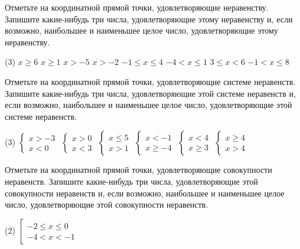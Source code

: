 \begin{class}[number=2]
	\begin{listofex}
		\item Отметьте на координатной прямой точки, удовлетворяющие неравенству. Запишите какие-нибудь три числа, удовлетворяющие этому неравенству и, если возможно, наибольшее и наименьшее целое число, удовлетворяющие этому неравенству.
		\begin{tasks}(3)
			\task \( x \ge 6 \)
			\task \( x \ge 1 \)
			\task \( x > -5 \)
			\task \( x > -2 \)
			\task \( -1 \le x \le 4 \)
			\task \( -4 < x \le 1 \)
			\task \( 3 \le x < 6 \)
			\task \( -1 < x \le 8 \)
		\end{tasks}
		\item Отметьте на координатной прямой точки, удовлетворяющие системе неравенств. Запишите какие-нибудь три числа, удовлетворяющие этой системе неравенств и, если возможно, наибольшее и наименьшее целое число, удовлетворяющие этой системе неравенств.
		\begin{tasks}(3)
			\task \( \begin{cases} x > -3 \\ x < 0 \end{cases} \)
			\task \( \begin{cases} x>0 \\ x<3 \end{cases} \)
			\task \( \begin{cases} x\le5 \\ x>1 \end{cases} \)
			\task \( \begin{cases} x<-1 \\ x\ge-4 \end{cases} \)
			\task \( \begin{cases} x<4 \\ x\ge3 \end{cases} \)
			\task \( \begin{cases} x\ge4 \\ x>4 \end{cases} \)
		\end{tasks}
		\item Отметьте на координатной прямой точки, удовлетворяющие совокупности неравенств. Запишите какие-нибудь три числа, удовлетворяющие этой совокупности неравенств и, если возможно, наибольшее и наименьшее целое число, удовлетворяющие этой совокупности неравенств.
		\begin{tasks}(2)
			\task \( \left[
			\begin{array}{l} -2 \le x \le 0 \\ -4 < x < -1 \end{array} \right. \)

\end{tasks}
\end{listofex}
\end{class}
